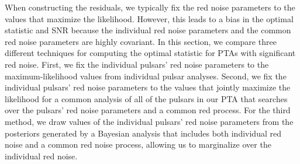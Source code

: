 \documentclass[twocolumn,aps,prd,superscriptaddress]{revtex4-1}
\begin{document}
When constructing the residuals, 
we typically fix the red noise parameters to the values that 
maximize the likelihood. 
However, this leads to a bias in the optimal statistic and SNR because 
the individual red noise parameters and the common red noise parameters 
are highly covariant. 
In this section, we compare three different techniques for computing the 
optimal statistic for PTAs with significant red noise. 
First, we fix the individual pulsars' red noise parameters to the 
maximum-likelihood values from individual pulsar analyses. 
Second, we fix the individual pulsars' red noise parameters to the 
values that jointly maximize the likelihood for a common analysis 
of all of the pulsars in our PTA 
that searches over the pulsars' red noise parameters and 
a common red process. 
For the third method, we draw values of the individual pulsars' 
red noise parameters from the posteriors generated by a Bayesian analysis 
that includes both individual red noise and a common red noise process, 
allowing us to marginalize over the individual red noise.
\end{document}
